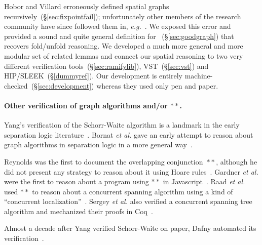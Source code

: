 Hobor and Villard erroneously defined spatial graphs 
recursively~(\S\ref{sec:fixpointfail}); unfortunately other members of the research 
community have since followed them in, \emph{e.g.}~\cite{raadvg15}.  We exposed this 
error and provided a sound and quite general definition for 
~(\S\ref{sec:goodgraph}) that recovers fold/unfold reasoning.  We developed a 
much more general and more modular set of related lemmas and connect our spatial 
reasoning to two very different verification tools~(\S\ref{sec:ramifylib}), 
VST~(\S\ref{sec:vst}) and HIP/SLEEK~(\S\ref{dummyref}).  Our development is entirely 
machine-checked~(\S\ref{sec:development}) whereas they used only pen and paper.
\fi

\paragraph{Other verification of graph algorithms and/or $**$.}
Yang's verification of the Schorr-Waite algorithm is a landmark in the early separation 
logic literature~\cite{hongseok:phd}.  Bornat \emph{et al.} gave an early attempt to 
reason about graph algorithms in separation logic in a more general 
way~\cite{bornat:aliasing04}.

Reynolds was the first to document the overlapping conjunction~$**$, although he did not 
present any strategy to reason about it using Hoare rules~\cite{rey-slnotes}.  
Gardner \emph{et al.} were the first to reason about a program using $**$ in 
Javascript~\cite{gardnerms12}.  Raad \emph{et al.} used $**$ to reason about a 
concurrent spanning algorithm using a kind of 
``concurrent localization''~\cite{raadvg15}.  Sergey \emph{et al.} also verified a 
concurrent spanning tree algorithm and mechanized their proofs in Coq~\cite{ilya-graphs}.

Almost a decade after Yang verified Schorr-Waite on paper, Dafny automated 
its verification~\cite{leino10}.


